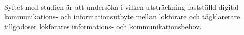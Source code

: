 \paragraph{}
\hspace{-11}Syftet med studien är att undersöka i vilken utsträckning fastställd digital kommunikations- och informationsutbyte mellan lokförare och tågklarerare tillgodoser lokförares informations- och kommunikationsbehov.
